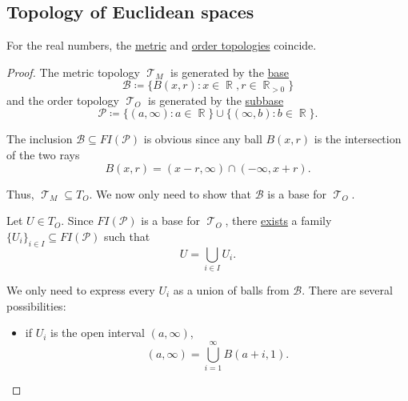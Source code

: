 \subsection{Topology of Euclidean spaces}\label{subsec:topology_of_euclidean_spaces}

\begin{theorem}\label{thm:real_metric_and_order_topologies_coincide}
  For the real numbers, the \hyperref[def:metric_topology]{metric} and \hyperref[def:order_topology]{order topologies} coincide.
\end{theorem}
\begin{proof}
  The metric topology \( \mscrT_M \) is generated by the \hyperref[def:topological_base]{base}
  \begin{equation*}
    \mathcal{B} \coloneqq \{ B(x, r) \colon x \in \BbbR, r \in \BbbR_{>0} \}
  \end{equation*}
  and the order topology \( \mscrT_O \) is generated by the \hyperref[def:topological_subbase]{subbase}
  \begin{equation*}
    \mathcal{P} \coloneqq \{ (a, \infty) \colon a \in \BbbR \} \cup \{ (\infty, b) \colon b \in \BbbR \}.
  \end{equation*}

  The inclusion \( \mathcal{B} \subseteq FI(\mathcal{P}) \) is obvious since any ball \( B(x, r) \) is the intersection of the two rays
  \begin{equation*}
    B(x, r) = (x - r, \infty) \cap (-\infty, x + r).
  \end{equation*}

  Thus, \( \mscrT_M \subseteq T_O \). We now only need to show that \( \mathcal{B} \) is a base for \( \mscrT_O \).

  Let \( U \in T_O \). Since \( FI(\mathcal{P}) \) is a base for \( \mscrT_O \), there \hyperref[def:topological_base/union]{exists} a family \( \{ U_i \}_{i \in I} \subseteq FI(\mathcal{P}) \) such that
  \begin{equation*}
    U = \bigcup_{i \in I} U_i.
  \end{equation*}

  We only need to express every \( U_i \) as a union of balls from \( \mathcal{B} \). There are several possibilities:
  \begin{itemize}
    \item if \( U_i \) is the open interval \( (a, \infty) \),
          \begin{equation*}
            (a, \infty) = \bigcup_{i=1}^\infty B(a + i, 1).
          \end{equation*}


\end{itemize}
\end{proof}
